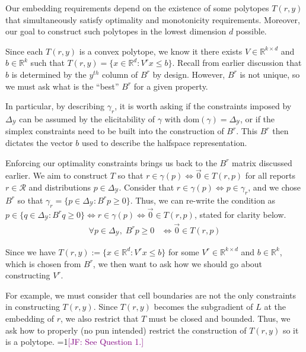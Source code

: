 \documentclass[12pt]{article}
\newcommand{\Comments}{1}
\newcommand{\mynote}[2]{\ifnum\Comments=1\textcolor{#1}{#2}\fi}
\newcommand{\jessie}[1]{\mynote{purple}{[JF: #1]}}
\newcommand{\reals}{\mathbb{R}}
\newcommand{\dom}{\mathrm{dom}}
\newcommand{\simplex}{\Delta_\Y}
\newcommand{\R}{\mathcal{R}}
\newcommand{\Y}{\mathcal{Y}}
\begin{document}
Our embedding requirements depend on the existence of some polytopes $T(r,y)$ that simultaneously satisfy optimality and monotonicity requirements.
Moreover, our goal to construct such polytopes in the lowest dimension $d$ possible.

Since each $T(r,y)$ is a convex polytope, we know it there exists $V \in \reals^{k \times d}$ and $b \in \reals^k$ such that $T(r,y) = \{x \in \reals^d : V^rx \leq b\}$.
Recall from earlier discussion that $b$ is determined by the $y^{th}$ column of $B^r$ by design.
However, $B^r$ is not unique, so we must ask what is the ``best'' $B^r$ for a given property.

In particular, by describing $\gamma_r$, it is worth asking if the constraints imposed by $\simplex$ can be assumed by the elicitability of $\gamma$ with $\dom(\gamma) = \simplex$, or if the simplex constraints need to be built into the construction of $B^r$.
This $B^r$ then dictates the vector $b$ used to describe the halfspace representation.



Enforcing our optimality constraints brings us back to the $B^r$ matrix discussed earlier.
We aim to construct $T$ so that $r \in \gamma(p) \iff \vec 0 \in T(r,p)$ for all reports $r \in \R$ and distributions $p \in \simplex$.
Consider that $r \in \gamma(p) \iff p \in \gamma_r$, and we chose $B^r$ so that $\gamma_r = \{p \in \simplex : B^rp \geq 0\}$.
Thus, we can re-write the condition as $p \in \{q \in \simplex : B^rq \geq 0\} \iff r \in \gamma(p) \iff \vec 0 \in T(r,p)$, stated for clarity below.
\begin{align*}
\forall p \in \simplex, \; B^r p \geq 0 &\iff \vec 0 \in T(r,p)
\end{align*}

Since we have $T(r,y) := \{x \in \reals^d : V^r x \leq b\}$ for some $V^r \in \reals^{k \times d}$ and $b \in \reals^k$, which is chosen from $B^r$, we then want to ask how we should go about constructing $V^r$.

For example, we must consider that cell boundaries are not the only constraints in constructing $T(r,y)$.
Since $T(r,y)$ becomes the subgradient of $L$ at the embedding of $r$, we also restrict that $T$ must be closed and bounded.
Thus, we ask how to properly (no pun intended) restrict the construction of $T(r,y)$ so it is a polytope. \jessie{See Question 1.}
\end{document}
